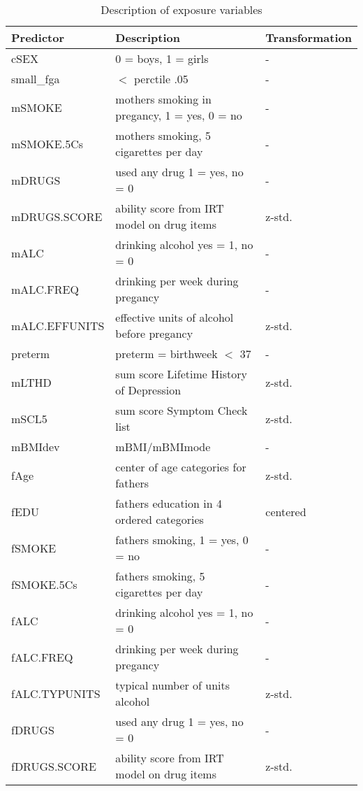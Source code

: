 \begin{table}[ht]
\centering
\begin{tabular}{lll}
  \hline
Predictor & Description & Transformation \\ 
  \hline
  cSEX & 0 = boys, 1 = girls & - \\ 
  small\_fga & $<$ perctile .05 & - \\ 
  mSMOKE & mothers smoking in pregancy, 1 = yes, 0 = no & - \\ 
  mSMOKE.5Cs & mothers smoking, 5 cigarettes per day & - \\ 
  mDRUGS & used any drug 1 = yes, no = 0 & - \\ 
  mDRUGS.SCORE & ability score from IRT model on drug items  &  z-std. \\ 
  mALC & drinking alcohol yes = 1, no = 0 & - \\ 
  mALC.FREQ & drinking per week during pregancy & - \\ 
  mALC.EFFUNITS & effective units of alcohol before pregancy  &  z-std. \\ 
  preterm & preterm = birthweek $<$ 37 & - \\ 
  mLTHD & sum score Lifetime History of Depression  &  z-std. \\ 
  mSCL5 & sum score Symptom Check list  &  z-std. \\ 
  mBMIdev & mBMI/mBMImode & - \\ 
  fAge & center of age categories for fathers  &  z-std. \\ 
  fEDU & fathers education in 4 ordered categories  & centered \\ 
  fSMOKE & fathers smoking, 1 = yes, 0 = no & - \\ 
  fSMOKE.5Cs & fathers smoking, 5 cigarettes per day & - \\ 
  fALC & drinking alcohol yes = 1, no = 0 & - \\ 
  fALC.FREQ & drinking per week during pregancy & - \\ 
  fALC.TYPUNITS & typical number of units alcohol  &  z-std. \\ 
  fDRUGS & used any drug 1 = yes, no = 0 & - \\ 
  fDRUGS.SCORE & ability score from IRT model on drug items  &  z-std.\\ 
   \hline
\end{tabular}
\caption{Description of exposure variables}
\label{table:exposures}
\end{table}
